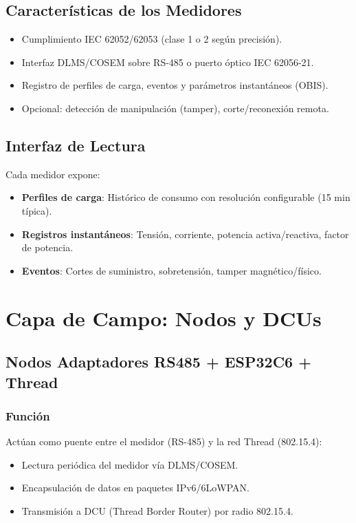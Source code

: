 \subsection{Características de los Medidores}

\begin{itemize}
    \item Cumplimiento IEC 62052/62053 (clase 1 o 2 según precisión).
    \item Interfaz DLMS/COSEM sobre RS-485 o puerto óptico IEC 62056-21.
    \item Registro de perfiles de carga, eventos y parámetros instantáneos (OBIS).
    \item Opcional: detección de manipulación (tamper), corte/reconexión remota.
\end{itemize}

\subsection{Interfaz de Lectura}

Cada medidor expone:
\begin{itemize}
    \item \textbf{Perfiles de carga}: Histórico de consumo con resolución configurable (15 min típica).
    \item \textbf{Registros instantáneos}: Tensión, corriente, potencia activa/reactiva, factor de potencia.
    \item \textbf{Eventos}: Cortes de suministro, sobretensión, tamper magnético/físico.
\end{itemize}

\section{Capa de Campo: Nodos y DCUs}

\subsection{Nodos Adaptadores RS485 + ESP32C6 + Thread}

\subsubsection{Función}

Actúan como puente entre el medidor (RS-485) y la red Thread (802.15.4):
\begin{itemize}
    \item Lectura periódica del medidor vía DLMS/COSEM.
    \item Encapsulación de datos en paquetes IPv6/6LoWPAN.
    \item Transmisión a DCU (Thread Border Router) por radio 802.15.4.
\end{itemize}

